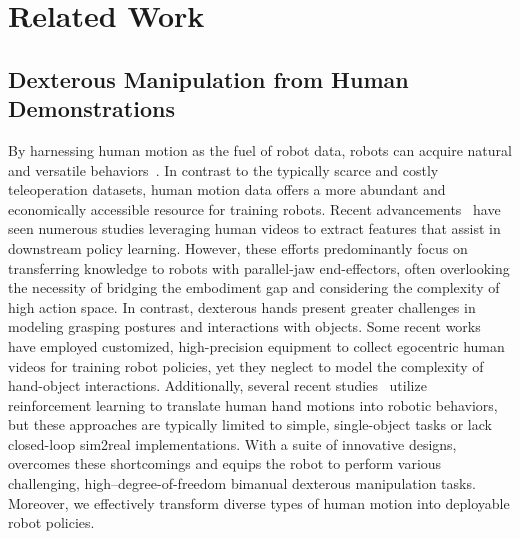 \section{Related Work}
\subsection{Dexterous Manipulation from Human Demonstrations} 
By harnessing human motion as the fuel of robot data, robots can acquire natural and versatile behaviors~\cite{argall2009survey,mandikal2022dexvip,shaw2023videodex,ye2023learning,qin2022dexmv,luo2024omnigrasp,ze2025twist,he2024learning}. In contrast to the typically scarce and costly teleoperation datasets, human motion data offers a more abundant and economically accessible resource for training robots. Recent advancements~\cite{zhou2025you,kim2025uniskill,lum2025crossing,dan2025x,wangmimicplay} have seen numerous studies leveraging human videos to extract features that assist in downstream policy learning. However, these efforts predominantly focus on transferring knowledge to robots with parallel-jaw end-effectors, often overlooking the necessity of bridging the embodiment gap and considering the complexity of high action space. In contrast, dexterous hands present greater challenges in modeling grasping postures and interactions with objects. Some recent works~\cite{kareer2024egomimic,hoque2025egodex,qiu2025humanoid} have employed customized, high-precision equipment to collect egocentric human videos for training robot policies, yet they neglect to model the complexity of hand-object interactions. Additionally, several recent studies~\cite{liu2025dextrack,chenobject,li2025maniptrans} utilize reinforcement learning to translate human hand motions into robotic behaviors, but these approaches are typically limited to simple, single-object tasks or lack closed-loop sim2real implementations. With a suite of innovative designs, \ourshort overcomes these shortcomings and equips the robot to perform various challenging, high–degree-of-freedom bimanual dexterous manipulation tasks. Moreover, we effectively transform diverse types of human motion into deployable robot policies.


